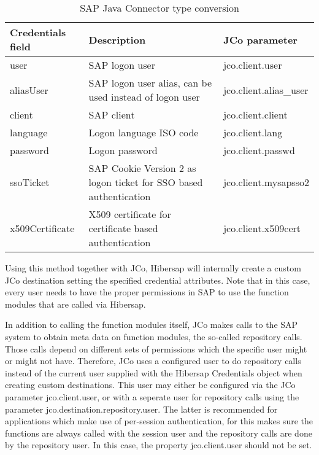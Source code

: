 \begin{table}[H]
  \renewcommand{\arraystretch}{1.5}
  \centering
   \begin{tabularx}{\textwidth}{ l X l }
    \toprule
    \textbf{Credentials field} & \textbf{Description}               & \textbf{JCo parameter} \\ 
    \midrule
    user                       & SAP logon user                     & jco.client.user \\
    aliasUser                  & SAP logon user alias, can be used 
                                 instead of logon user              & jco.client.alias\_user \\
    client                     & SAP client                         & jco.client.client \\
    language                   & Logon language ISO code            & jco.client.lang \\
    password                   & Logon password                     & jco.client.passwd \\
    ssoTicket                  & SAP Cookie Version 2 as logon 
                                 ticket for SSO based 
                                 authentication                     & jco.client.mysapsso2 \\
    x509Certificate            & X509 certificate for certificate 
                                 based authentication               & jco.client.x509cert \\
    \bottomrule
  \end{tabularx}
  \caption{SAP Java Connector type conversion}
  \label{tab:SAPCredentials}
\end{table}

Using this method together with JCo, Hibersap will internally create a custom JCo destination setting the specified credential attributes. Note that in this case, every user needs to have the proper permissions in SAP to use the function modules that are called via Hibersap. 

In addition to calling the function modules itself, JCo makes calls to the SAP system to obtain meta data on function modules, the so-called repository calls. Those calls depend on different sets of permissions which the specific user might or might not have. Therefore, JCo uses a configured user to do repository calls instead of the current user supplied with the Hibersap Credentials object when creating custom destinations. This user may either be configured via the JCo parameter jco.client.user, or with a seperate user for repository calls using the parameter jco.destination.repository.user. The latter is recommended for applications which make use of per-session authentication, for this makes sure the functions are always called with the session user and the repository calls are done by the repository user. In this case, the property jco.client.user should not be set.


